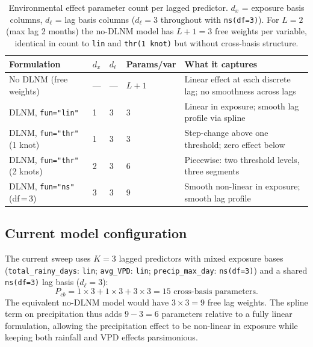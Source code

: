 \documentclass[12pt,a4paper]{article}
\begin{document}
\begin{table}[ht]
\centering
\small
\begin{tabular}{p{3.5cm}p{2cm}p{2cm}p{2.5cm}p{4.0cm}}
\toprule
\textbf{Formulation} & $d_x$ & $d_\ell$ & \textbf{Params/var} & \textbf{What it captures} \\
\midrule
No DLNM (free weights) & --- & --- & $L+1$ & Linear effect at each discrete lag; no smoothness across lags \\
\addlinespace
DLNM, \texttt{fun="lin"} & 1 & 3 & 3 & Linear in exposure; smooth lag profile via spline \\
\addlinespace
DLNM, \texttt{fun="thr"} (1 knot) & 1 & 3 & 3 & Step-change above one threshold; zero effect below \\
\addlinespace
DLNM, \texttt{fun="thr"} (2 knots) & 2 & 3 & 6 & Piecewise: two threshold levels, three segments \\
\addlinespace
DLNM, \texttt{fun="ns"} (df\,=\,3) & 3 & 3 & 9 & Smooth non-linear in exposure; smooth lag profile \\
\bottomrule
\end{tabular}
\caption{Environmental effect parameter count per lagged predictor. $d_x$ = exposure basis columns, $d_\ell$ = lag basis columns ($d_\ell=3$ throughout with \texttt{ns(df=3)}). For $L=2$ (max lag 2 months) the no-DLNM model has $L+1=3$ free weights per variable, identical in count to \texttt{lin} and \texttt{thr(1 knot)} but without cross-basis structure.}
\end{table}

\subsection*{Current model configuration}

The current sweep uses $K=3$ lagged predictors with mixed exposure bases (\texttt{total\_rainy\_days}: \texttt{lin}; \texttt{avg\_VPD}: \texttt{lin}; \texttt{precip\_max\_day}: \texttt{ns(df=3)}) and a shared \texttt{ns(df=3)} lag basis ($d_\ell = 3$):
\begin{equation}
  P_{cb} = 1\times3 + 1\times3 + 3\times3 = 15 \text{ cross-basis parameters.}
\end{equation}
The equivalent no-DLNM model would have $3 \times 3 = 9$ free lag weights. The spline term on precipitation thus adds $9 - 3 = 6$ parameters relative to a fully linear formulation, allowing the precipitation effect to be non-linear in exposure while keeping both rainfall and VPD effects parsimonious.
\end{document}
